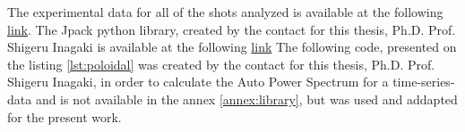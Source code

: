 \clearpage
{}
\setcounter{section}{0}
\renewcommand{\thesection}{\arabic{section}}
\renewcommand{\theHsection}{annex.\thesection}

\label{annex:data}
The experimental data for all of the shots analyzed is available at the following \href{https://heliotronj.iae.kyoto-u.ac.jp/expdata.html}{link}.
\newpage
{}
\label{annex:library}
The Jpack python library, created by the contact for this thesis, Ph.D. Prof. Shigeru Inagaki  is available at the following \href{https://u.pcloud.link/publink/show?code=kZ973Q5ZzW7AVPrWVSbP0hxJ74Tc45AOze27}{link}
\newpage
{}
The following code, presented on the listing \ref{lst:poloidal} was created by the contact for this thesis, Ph.D. Prof. Shigeru Inagaki, in order to calculate the Auto Power Spectrum for a time-series-data and is not available in the annex \ref{annex:library}, but was used and addapted for the present work.
\label{annex:poloidalm}

